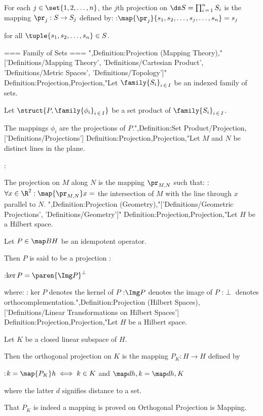 For each $j \in \set {1, 2, \ldots, n}$, the $j$th projection on $\ds S = \prod_{i \mathop = 1}^n S_i$ is the mapping $\pr_j: S \to S_j$ defined by:
:$\map {\pr_j} {s_1, s_2, \ldots, s_j, \ldots, s_n} = s_j$

for all $\tuple {s_1, s_2, \ldots, s_n} \in S$.


=== Family of Sets ===
",Definition:Projection (Mapping Theory),"['Definitions/Mapping Theory', 'Definitions/Cartesian Product', 'Definitions/Metric Spaces', 'Definitions/Topology']"
Definition:Projection,Projection,"Let $\family {S_i}_{i \mathop \in I}$ be an indexed family of sets.

Let $\struct {P, \family {\phi_i}_{i \mathop \in I} }$ be a set product of $\family {S_i}_{i \mathop \in I}$.


The mappings $\phi_i$ are the projections of $P$.",Definition:Set Product/Projection,['Definitions/Projections']
Definition:Projection,Projection,"Let $M$ and $N$ be distinct lines in the plane.

:

The projection on $M$ along $N$ is the mapping $\pr_{M, N}$ such that:
:$\forall x \in \R^2: \map {\pr_{M, N} } x =$ the intersection of $M$ with the line through $x$ parallel to $N$.
",Definition:Projection (Geometry),"['Definitions/Geometric Projections', 'Definitions/Geometry']"
Definition:Projection,Projection,"Let $H$ be a Hilbert space.

Let $P \in \map B H$ be an idempotent operator.


Then $P$ is said to be a projection :

:$\ker P = \paren {\Img P}^\perp$

where:
:$\ker P$ denotes the kernel of $P$
:$\Img P$ denotes the image of $P$
:$\perp$ denotes orthocomplementation.",Definition:Projection (Hilbert Spaces),['Definitions/Linear Transformations on Hilbert Spaces']
Definition:Projection,Projection,"Let $H$ be a Hilbert space.

Let $K$ be a closed linear subspace of $H$.


Then the orthogonal projection on $K$ is the mapping $P_K: H \to H$ defined by

:$k = \map {P_K} h \iff k \in K$ and $\map d {h, k} = \map d {h, K}$

where the latter $d$ signifies distance to a set.


That $P_K$ is indeed a mapping is proved on Orthogonal Projection is Mapping.




